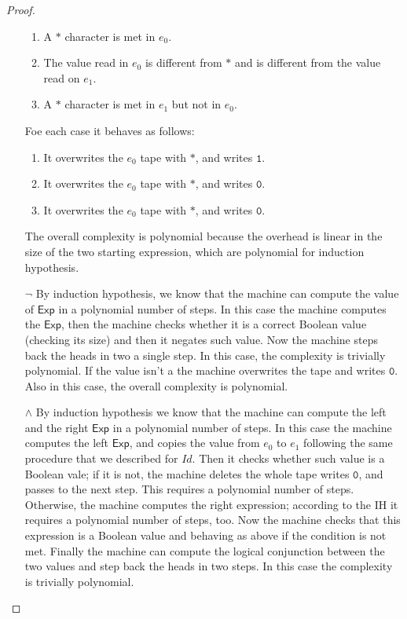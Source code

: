 \documentclass[10pt]{amsart}
\newcommand{\zero}{\mathtt{0}}
\newcommand{\one}{\mathtt{1}}
\newcommand{\xp}{\mathsf{Exp}}
\begin{document}
\begin{proof}
\begin{itemize}
\begin{enumerate}
\item A $*$ character is met in $e_0$.
\item The value read in $e_0$ is different from $*$ and is different from the value read on $e_1$.
\item A $*$ character is met in $e_1$ but not in $e_0$.
\end{enumerate}
Foe each case it behaves as follows:
\begin{enumerate}
\item It overwrites the $e_0$ tape with $*$, and writes $\one$.
\item It overwrites the $e_0$ tape with $*$, and writes $\zero$.
\item It overwrites the $e_0$ tape with $*$, and writes $\zero$.
\end{enumerate}
The overall complexity is polynomial because the overhead is linear in the size of the two starting expression, which are polynomial for induction hypothesis.
\item[$\lnot$] By induction hypothesis, we know that the machine can compute the value of $\xp$ in a polynomial number of steps. In this case the machine computes the $\xp$, then the machine checks whether it is a correct Boolean value (checking its size) and then it negates such value. Now the machine steps back the heads in two a single step. In this case, the complexity is trivially polynomial. If the value isn't a the machine overwrites the tape and writes $\zero$. Also in this case, the overall complexity is polynomial.
\item[$\land$] By induction hypothesis we know that the machine can compute the left and the right $\xp$ in a polynomial number of steps. In this case the machine computes the left $\xp$, and copies the value from $e_0$ to $e_1$ following the same procedure that we described for $Id$. Then it checks whether such value is a Boolean vale; if it is not, the machine deletes the whole tape writes $\zero$, and passes to the next step. This requires a polynomial number of steps. Otherwise, the machine computes the right expression; according to the IH it requires a polynomial number of steps, too. Now the machine checks that this expression is a Boolean value and behaving as above if the condition is not met. Finally the machine can compute the logical conjunction between the two values and step back the heads in two steps. In this case the complexity is trivially polynomial.
\end{itemize}


\end{proof}
\end{document}
